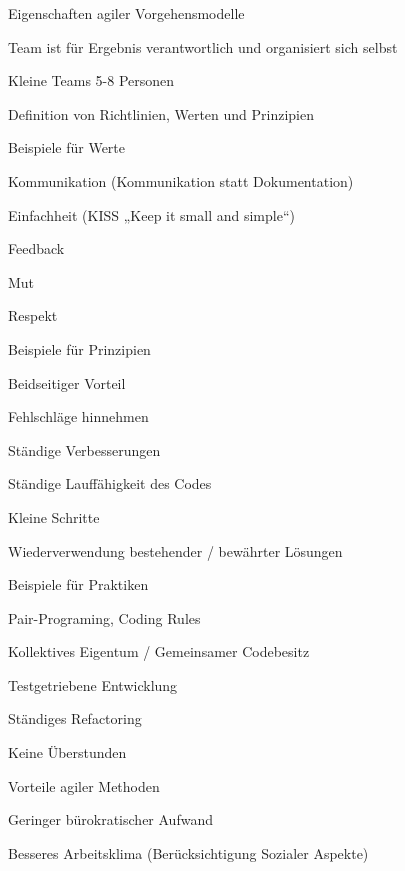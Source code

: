 \documentclass[a4paper]{article}
\begin{document}
\begin{multicols}{3}
  Eigenschaften agiler Vorgehensmodelle
  \begin{itemize*}
    \item Team ist für Ergebnis verantwortlich und organisiert sich selbst
    \item Kleine Teams 5-8 Personen
    \item Definition von Richtlinien, Werten und Prinzipien
    \item Beispiele für Werte
          \begin{itemize*}
            \item Kommunikation (Kommunikation statt Dokumentation)
            \item Einfachheit (KISS „Keep it small and simple“)
            \item Feedback
            \item Mut
            \item Respekt
          \end{itemize*}
    \item Beispiele für Prinzipien
          \begin{itemize*}
            \item Beidseitiger Vorteil
            \item Fehlschläge hinnehmen
            \item Ständige Verbesserungen
            \item Ständige Lauffähigkeit des Codes
            \item Kleine Schritte
            \item Wiederverwendung bestehender / bewährter Lösungen
          \end{itemize*}
    \item Beispiele für Praktiken
          \begin{itemize*}
            \item Pair-Programing, Coding Rules
            \item Kollektives Eigentum / Gemeinsamer Codebesitz
            \item Testgetriebene Entwicklung
            \item Ständiges Refactoring
            \item Keine Überstunden
          \end{itemize*}
    \item Vorteile agiler Methoden
          \begin{itemize*}
            \item Geringer bürokratischer Aufwand
            \item Besseres Arbeitsklima (Berücksichtigung Sozialer Aspekte)

\end{itemize*}
\end{itemize*}
\end{multicols}
\end{document}
